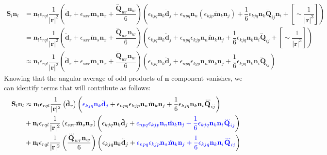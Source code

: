 \documentclass[10pt, a4paper]{article}
\begin{document}
{\begin{align*}
    \mathbf{S}_l \mathbf{n}_l &= \mathbf{n}_l\epsilon_{rq l}\dfrac{1}{|\mathbf{r}|^2}\left(\ddot{\mathbf{d}}_r + \epsilon_{sxr}\ddot{\mathbf{m}}_s \mathbf{n}_x + \dfrac{\dddot{\mathbf{Q}}_{wr} \mathbf{n}_w}{6}\right) \left(\epsilon_{kjq}\mathbf{n}_k \ddot{\mathbf{d}}_j + \epsilon_{npq} \mathbf{n}_n  (\epsilon_{kjp} \ddot{\mathbf{m}}_k \mathbf{n}_j) + \dfrac{1}{6} \epsilon_{kj q}\mathbf{n}_k \dddot{\mathbf{Q}}_{ij} \mathbf{n}_i + \left[\sim \dfrac{1}{|\mathbf{r}|^3}\right]\right)\\
    &= \mathbf{n}_l\epsilon_{rq l}\dfrac{1}{|\mathbf{r}|^2}\left(\ddot{\mathbf{d}}_r + \epsilon_{sxr}\ddot{\mathbf{m}}_s \mathbf{n}_x + \dfrac{\dddot{\mathbf{Q}}_{wr} \mathbf{n}_w}{6}\right) \left(\epsilon_{kjq}\mathbf{n}_k \ddot{\mathbf{d}}_j + \epsilon_{npq} \epsilon_{kjp} \mathbf{n}_n \ddot{\mathbf{m}}_k \mathbf{n}_j + \dfrac{1}{6} \epsilon_{kj q}\mathbf{n}_k  \mathbf{n}_i \dddot{\mathbf{Q}}_{ij} + \left[\sim \dfrac{1}{|\mathbf{r}|^3}\right]\right)\\
    &\approx \mathbf{n}_l\epsilon_{rq l}\dfrac{1}{|\mathbf{r}|^2}\left(\ddot{\mathbf{d}}_r + \epsilon_{sxr}\ddot{\mathbf{m}}_s \mathbf{n}_x + \dfrac{\dddot{\mathbf{Q}}_{wr} \mathbf{n}_w}{6}\right) \left(\epsilon_{kjq}\mathbf{n}_k \ddot{\mathbf{d}}_j + \epsilon_{npq} \epsilon_{kjp} \mathbf{n}_n \ddot{\mathbf{m}}_k \mathbf{n}_j + \dfrac{1}{6} \epsilon_{kj q}\mathbf{n}_k  \mathbf{n}_i \dddot{\mathbf{Q}}_{ij} \right)
\end{align*}
Knowing that the angular average of odd products of $\mathbf{n}$ component vanishes, we can identify terms that will contribute as follows: 
\begin{align*}
    \mathbf{S}_l \mathbf{n}_l &\approx \mathbf{n}_l\epsilon_{rq l}\dfrac{1}{|\mathbf{r}|^2}\left(\ddot{\mathbf{d}}_r\right) \left(\textcolor{blue}{\epsilon_{kjq}\mathbf{n}_k \ddot{\mathbf{d}}_j} + \epsilon_{npq} \epsilon_{kjp} \mathbf{n}_n \ddot{\mathbf{m}}_k \mathbf{n}_j + \dfrac{1}{6} \epsilon_{kj q}\mathbf{n}_k  \mathbf{n}_i \dddot{\mathbf{Q}}_{ij} \right)\\ 
    &+ \mathbf{n}_l\epsilon_{rq l}\dfrac{1}{|\mathbf{r}|^2}\left(\epsilon_{sxr}\ddot{\mathbf{m}}_s \mathbf{n}_x\right) \left(\epsilon_{kjq}\mathbf{n}_k \ddot{\mathbf{d}}_j + \textcolor{blue}{\epsilon_{npq} \epsilon_{kjp} \mathbf{n}_n \ddot{\mathbf{m}}_k \mathbf{n}_j + \dfrac{1}{6} \epsilon_{kj q}\mathbf{n}_k  \mathbf{n}_i \dddot{\mathbf{Q}}_{ij}} \right)\\
    &+ \mathbf{n}_l\epsilon_{rq l}\dfrac{1}{|\mathbf{r}|^2}\left(\dfrac{\dddot{\mathbf{Q}}_{wr} \mathbf{n}_w}{6}\right) \left(\epsilon_{kjq}\mathbf{n}_k \ddot{\mathbf{d}}_j + \textcolor{blue}{\epsilon_{npq} \epsilon_{kjp} \mathbf{n}_n \ddot{\mathbf{m}}_k \mathbf{n}_j + \dfrac{1}{6} \epsilon_{kj q}\mathbf{n}_k  \mathbf{n}_i \dddot{\mathbf{Q}}_{ij}} \right)

\end{align*}}
\end{document}
